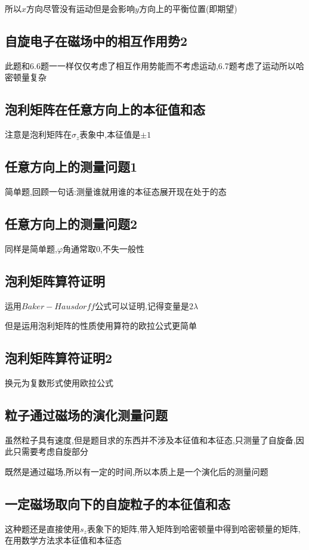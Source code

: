 \documentclass{article}
\begin{document}
            所以$x$方向尽管没有运动但是会影响$y$方向上的平衡位置(即期望)

        \subsection{自旋电子在磁场中的相互作用势2}

            此题和6.6题一一样仅仅考虑了相互作用势能而不考虑运动,6.7题考虑了运动所以哈密顿量复杂

        \subsection{泡利矩阵在任意方向上的本征值和态}
            注意是泡利矩阵在$\sigma_{z}$表象中,本征值是$\pm1$

        \subsection{任意方向上的测量问题1}
            简单题,回顾一句话:测量谁就用谁的本征态展开现在处于的态

        \subsection{任意方向上的测量问题2}
            同样是简单题,$\varphi$角通常取0,不失一般性

        \subsection{泡利矩阵算符证明}
            运用$Baker-Hausdorff$公式可以证明,记得变量是$2\lambda$

            但是运用泡利矩阵的性质使用算符的欧拉公式更简单

        \subsection{泡利矩阵算符证明2}
            换元为复数形式使用欧拉公式

        \subsection{粒子通过磁场的演化测量问题}
            虽然粒子具有速度,但是题目求的东西并不涉及本征值和本征态,只测量了自旋备,因此只需要考虑自旋部分

            既然是通过磁场,所以有一定的时间,所以本质上是一个演化后的测量问题

        \subsection{一定磁场取向下的自旋粒子的本征值和态}
            这种题还是直接使用$s_{z}$表象下的矩阵,带入矩阵到哈密顿量中得到哈密顿量的矩阵,在用数学方法求本征值和本征态
\end{document}
